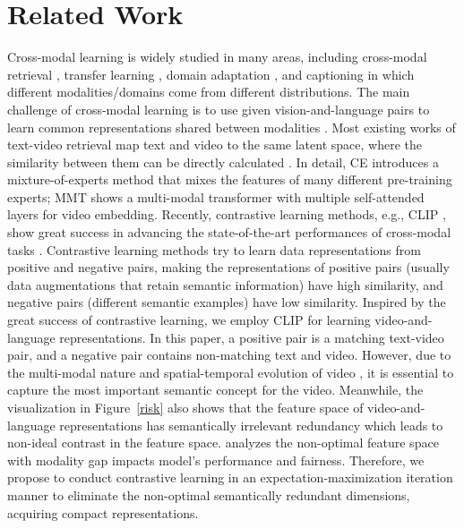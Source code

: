 \documentclass{article}
\begin{document}
\vspace{-5pt}
\section{Related Work}
\vspace{-5pt}
Cross-modal learning is widely studied in many areas, including cross-modal retrieval \cite{Yu2017Retrieval,wu2018unsupervised,hjelm2018learning}, transfer learning \cite{phung2021learning,neyshabur2020being}, domain adaptation \cite{stojanov2021domain,liang2021pareto}, and captioning \cite{liu2020prophet} in which different modalities/domains come from different distributions. The main challenge of cross-modal learning is to use given vision-and-language pairs to learn common representations shared between modalities \cite{liu2019MIA}.
Most existing works of text-video retrieval \cite{chen2020a,he2020momentum,gorti2022x} map text and video to the same latent space, where the similarity between them can be directly calculated \cite{gabeur2022masking,cao2022visual,wang2022many,dong2021dual,wei2021universal,wray2021semantic,chen2021learning,croitoruteachtext,yang2021taco,qi2021semantics}. In detail, CE \cite{liu2019use} introduces a mixture-of-experts method that mixes the features of many different pre-training experts; MMT \cite{gabeur2020multi} shows a multi-modal transformer with multiple self-attended layers for video embedding. Recently, contrastive learning methods, e.g., CLIP \cite{radford2021learning}, show great success in advancing the state-of-the-art performances of cross-modal tasks \cite{luo2021clip4clip}.
Contrastive learning methods \cite{dosovitskiy2014discriminative,cao2022locvtp,he2020momentum,misra2020self,chen2020improved,liu2021CA} try to learn data representations from positive and negative pairs, making the representations of positive pairs (usually data augmentations that retain semantic information) have high similarity, and negative pairs (different semantic examples) have low similarity. Inspired by the great success of contrastive learning, we employ CLIP \cite{radford2021learning} for learning video-and-language representations. In this paper, a positive pair is a matching text-video pair, and a negative pair contains non-matching text and video. However, due to the multi-modal nature and spatial-temporal evolution of video \cite{chen2019weakly,liu2017hierarchical}, it is essential to capture the most important semantic concept for the video. Meanwhile, the visualization in Figure~\ref{risk} also shows that the feature space of video-and-language representations has semantically irrelevant redundancy which leads to non-ideal contrast in the feature space. \cite{liang2022mind} analyzes the non-optimal feature space with modality gap impacts model's performance and fairness.
Therefore, we propose to conduct contrastive learning in an expectation-maximization iteration manner to eliminate the non-optimal semantically redundant dimensions, acquiring compact representations.
\end{document}
